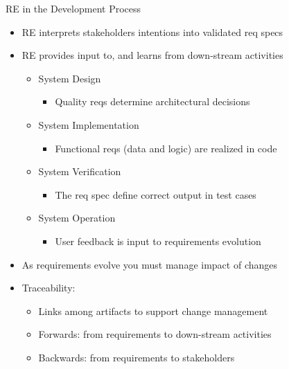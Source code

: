 

\begin{Slide}{RE in the Development Process}

\begin{itemize}
\item RE interprets stakeholders intentions into validated req specs
\item RE provides input to, and learns from down-stream activities
\begin{itemize}
\item System Design
\begin{itemize}
\item Quality reqs determine architectural decisions
\end{itemize}
\item System Implementation
\begin{itemize}
\item Functional reqs (data and logic) are realized in code  
\end{itemize}
\item System Verification 
\begin{itemize}
\item The req spec define correct output in test cases
\end{itemize}
\item System Operation
\begin{itemize}
\item User feedback is input to requirements evolution
\end{itemize}
\end{itemize}
\item As requirements evolve you must manage impact of changes
\item Traceability: 
\begin{itemize}
\item Links among artifacts to support change management
\item Forwards: from requirements to down-stream activities
\item Backwards: from requirements to stakeholders

\end{itemize}
\end{itemize}
\end{Slide}